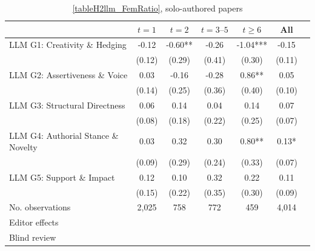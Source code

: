 \begin{table}
    \footnotesize
    \centering
    \begin{threeparttable}
        \caption{\autoref{tableH2llm_FemRatio}, solo-authored papers}
        \label{tableH2llm_FemSolo}
        \begin{tabular}{p{3cm}S@{}S@{}S@{}S@{}S@{}S@{}}
            \toprule
            &{\(t=1\)}&{\(t=2\)}&{\(t=3\text{--}5\)}&{\(t\ge6\)}&{All}\\
            \midrule
            LLM G1: Creativity \& Hedging &       -0.12   &       -0.60** &       -0.26   &       -1.04***&       -0.15   \\
                                          &      (0.12)   &      (0.29)   &      (0.41)   &      (0.30)   &      (0.11)   \\
            LLM G2: Assertiveness \& Voice&        0.03   &       -0.16   &       -0.28   &        0.86** &        0.05   \\
                                          &      (0.14)   &      (0.25)   &      (0.36)   &      (0.40)   &      (0.10)   \\
            LLM G3: Structural Directness &        0.06   &        0.14   &        0.04   &        0.14   &        0.07   \\
                                          &      (0.08)   &      (0.18)   &      (0.22)   &      (0.25)   &      (0.07)   \\
            LLM G4: Authorial Stance \& Novelty&        0.03   &        0.32   &        0.30   &        0.80** &        0.13*  \\
                                          &      (0.09)   &      (0.29)   &      (0.24)   &      (0.33)   &      (0.07)   \\
            LLM G5: Support \& Impact     &        0.12   &        0.10   &        0.32   &        0.22   &        0.11   \\
                                          &      (0.15)   &      (0.22)   &      (0.35)   &      (0.30)   &      (0.09)   \\
            \midrule
            No. observations              &       2,025   &         758   &         772   &         459   &       4,014   \\
            \midrule
Editor effects        &           {}   &           {}   &           {}   &           {}   &           {}   \\
            Blind review                  &           {}   &           {}   &           {}   &           {}   &           {}   \\

\end{tabular}
\end{threeparttable}
\end{table}
